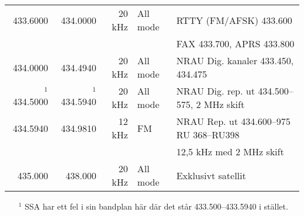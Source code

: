 \documentclass[10pt,swedish,a4paper,twoside]{article}
\begin{document}
\begin{landscape}
\begin{tabular}{rrrll}
	         433.6000 &      434.0000 &      20 kHz & All mode        & RTTY (FM/AFSK) 433.600                            \\
	                  &               &             &                 & FAX 433.700, APRS 433.800                         \\ \hline
	         434.0000 &      434.4940 &      20 kHz & All mode        & NRAU Dig. kanaler 433.450, 434.475                \\ \hline
	    $^1$ 434.5000 & $^1$ 434.5940 &      20 kHz & All mode        & NRAU Dig. rep. ut 434.500--575, 2 MHz skift       \\ \hline
	         434.5940 &      434.9810 &      12 kHz & FM              & NRAU Rep. ut 434.600--975 RU 368--RU398           \\
	                  &               &             &                 & 12,5 kHz med 2 MHz skift                          \\ \hline
	          435.000 &       438.000 &      20 kHz & All mode        & Exklusivt satellit                                \\ \hline
\end{tabular}

	\begin{itemize}
		\item[$^1$] SSA har ett fel i sin bandplan här där det står 433.500--433.5940 i stället.
	\end{itemize}
\end{landscape}
\end{document}
